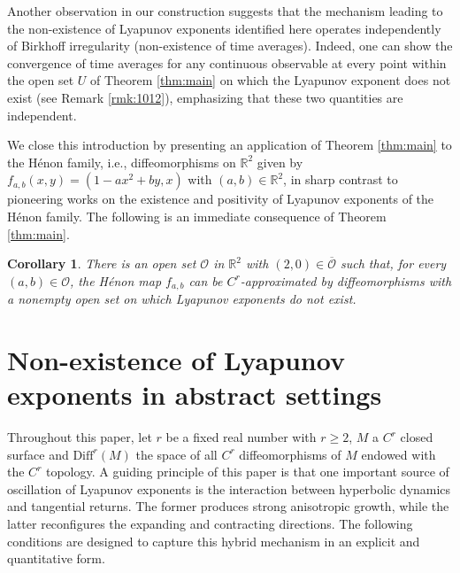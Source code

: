 \documentclass{amsart}
\theoremstyle{plain}
\newtheorem{cor}[thm]{Corollary}
\theoremstyle{definition}
\theoremstyle{remark}
\numberwithin{equation}{section}
\begin{document}
Another observation in our construction suggests that the mechanism leading to the non-existence of Lyapunov exponents identified here operates independently of Birkhoff irregularity (non-existence of time averages).
Indeed, one can show the convergence of time averages for any continuous observable at every point within the open set $U$ of Theorem \ref{thm:main} on which the Lyapunov exponent does not exist (see Remark \ref{rmk:1012}), emphasizing that these two quantities are independent.

We close this introduction by presenting an application of Theorem \ref{thm:main} to the H\'enon family, 
i.e., diffeomorphisms on $\mathbb{R}^2$ given by $f_{a,b}(x, y)=(1 - ax^2 + by, x)$ with $(a,b)\in\mathbb R^2$, 
 in sharp contrast to pioneering works \cite{BC91, MV93, BY93, BV01} on the existence and positivity of Lyapunov exponents of the H\'enon family.
The following is an immediate consequence of Theorem \ref{thm:main}.
\enlargethispage{\baselineskip}
\begin{cor}
There is an open set $\mathcal{O}$ in $\mathbb R^2$ 
with 
$(2, 0) \in\overline{\mathcal O}$ such that, for every 
$(a,b) \in\mathcal O$, 
the H\'enon map $f_{a,b}$ can be $C^{r}$-approximated by diffeomorphisms with a nonempty open set
on which Lyapunov exponents do not exist.
\end{cor}




\section{Non-existence of Lyapunov exponents in abstract settings}\label{Sec2}


Throughout this paper, let $r$ be a fixed real number with $r\ge 2$, $M$ a $C^r$ closed surface and $\mbox{Diff}^r(M)$ the space of all $C^r$ diffeomorphisms of $M$ endowed with the $C^r$ topology. 
A guiding principle of this paper is that one important source of oscillation of Lyapunov exponents is the interaction between hyperbolic dynamics and tangential returns. The former produces strong anisotropic growth, while the latter reconfigures the expanding and contracting directions. The following conditions are designed to capture this hybrid mechanism in an explicit and quantitative form.
\end{document}
